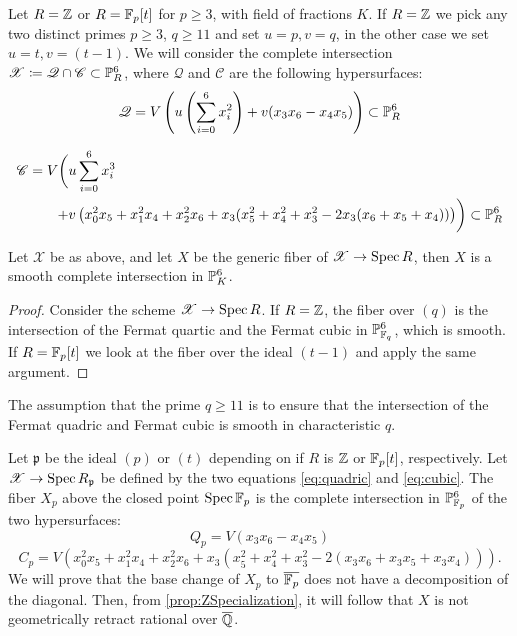 Let $R = \Z$ or $R=\F_p[t]$ for $p \geq 3$, with field of fractions $K$. If $R=\Z$ we pick any two distinct primes $p \geq 3$, $q \geq 11$ and set $u=p,v=q$, in the other case we set $u=t,v=(t-1)$. We will consider the complete intersection $\mathscr{X} \coloneqq \mathscr{Q} \cap \mathscr{C} \subset \P_{R}^6$, where $\mathscr{Q}$ and $\mathscr{C}$ are the following hypersurfaces:
\begin{equation}
  \label{eq:quadric}
   \mathscr{Q} =V\left(  u \left(\sum_{i=0}^6 x_i^2 \right) + v(x_3x_6-x_4x_5) \right)  \subset \P_{R}^6
\end{equation}

\begin{equation}
  \label{eq:cubic}
  \begin{split}
  \mathscr{C} = V\biggl( &u \sum_{i=0}^6 x_i^3 \\ + &v\left(x_0^2x_5 + x_1^2x_4 + x_2^2x_6 + x_3(x_5^2+x_4^2+x_3^2 -2x_3(x_6 + x_5 + x_4))\right) \biggr) \subset \P_{R}^6
  \end{split}
\end{equation}

\begin{lemma}
  Let $\mathscr{X}$ be as above, and let $X$ be the generic fiber of $\mathscr{X} \to \Spec R$, then $X$ is a smooth complete intersection in $\P_{K}^6$.
\end{lemma}
\begin{proof}
  Consider the scheme $\mathscr{X} \to \Spec R$.  If $R=\Z$, the fiber over $(q)$ is the intersection of the Fermat quartic and the Fermat cubic in $\P_{\F_q }^6$, which is smooth. If $R=\F_p[t]$ we look at the fiber over the ideal $(t-1)$ and apply the same argument.
\end{proof}
\begin{remark}
\label{rmk:Characteristics}
  The assumption that the prime $q \geq 11$ is to ensure that the intersection of the Fermat quadric and Fermat cubic is smooth in characteristic $q$.
\end{remark}


Let $\mathfrak{p}$ be the ideal $(p)$ or $(t)$ depending on if $R$ is $\Z$ or $\F_p[t]$, respectively. Let $\mathscr{X} \to \Spec R_{\mathfrak{p}}$ be defined by the two equations \eqref{eq:quadric} and \eqref{eq:cubic}. The fiber $X_p$ above the closed point $\Spec \F_p$ is the complete intersection in $\P^6_{\F_p}$ of the two hypersurfaces:
\begin{equation}
  \label{eq:Qquadric}
  Q_p = V(x_3x_6-x_4x_5)
\end{equation}
\begin{equation}
  \label{eq:Qqubic}
  C_p = V \left(x_0^2x_5 + x_1^2x_4 + x_2^2x_6 + x_3(x_5^2+x_4^2+x_3^2 -2(x_3x_6 + x_3x_5 + x_3x_4)) \right).
\end{equation}
We will prove that the base change of $X_p$ to $\overline{\F_p}$ does not have a decomposition of the diagonal. Then, from \cref{prop:ZSpecialization}, it will follow that $X$ is not geometrically retract rational over $\overline{\Q}$.

